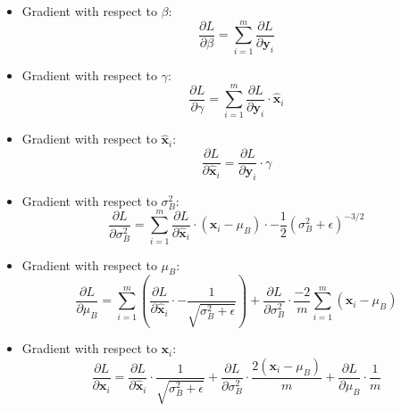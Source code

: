 \documentclass{article}
\begin{document}
\begin{itemize}
    \item Gradient with respect to \( \beta \):
    \begin{equation}
    \frac{\partial L}{\partial \beta} = \sum_{i=1}^{m} \frac{\partial L}{\partial \mathbf{y}_i}
    \end{equation}

    \item Gradient with respect to \( \gamma \):
    \begin{equation}
    \frac{\partial L}{\partial \gamma} = \sum_{i=1}^{m} \frac{\partial L}{\partial \mathbf{y}_i} \cdot \hat{\mathbf{x}}_i
    \end{equation}

    \item Gradient with respect to \( \hat{\mathbf{x}}_i \):
    \begin{equation}
    \frac{\partial L}{\partial \hat{\mathbf{x}}_i} = \frac{\partial L}{\partial \mathbf{y}_i} \cdot \gamma
    \end{equation}

    \item Gradient with respect to \( \sigma_B^2 \):
    \begin{equation}
    \frac{\partial L}{\partial \sigma_B^2} = \sum_{i=1}^{m} \frac{\partial L}{\partial \hat{\mathbf{x}}_i} \cdot (\mathbf{x}_i - \mu_B) \cdot -\frac{1}{2} (\sigma_B^2 + \epsilon)^{-3/2}
    \end{equation}

    \item Gradient with respect to \( \mu_B \):
    \begin{equation}
    \frac{\partial L}{\partial \mu_B} = \sum_{i=1}^{m} \left( \frac{\partial L}{\partial \hat{\mathbf{x}}_i} \cdot -\frac{1}{\sqrt{\sigma_B^2 + \epsilon}} \right) + \frac{\partial L}{\partial \sigma_B^2} \cdot \frac{-2}{m} \sum_{i=1}^{m} (\mathbf{x}_i - \mu_B)
    \end{equation}

    \item Gradient with respect to \( \mathbf{x}_i \):
    \begin{equation}
    \frac{\partial L}{\partial \mathbf{x}_i} = \frac{\partial L}{\partial \hat{\mathbf{x}}_i} \cdot \frac{1}{\sqrt{\sigma_B^2 + \epsilon}} + \frac{\partial L}{\partial \sigma_B^2} \cdot \frac{2 (\mathbf{x}_i - \mu_B)}{m} + \frac{\partial L}{\partial \mu_B} \cdot \frac{1}{m}
    \end{equation}
\end{itemize}
\end{document}
